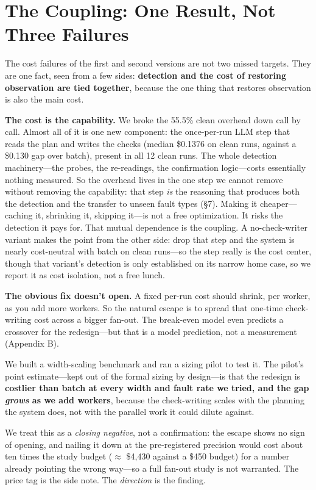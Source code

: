 \documentclass[acmsmall,screen]{acmart}
\begin{document}
\section{The Coupling: One Result, Not Three Failures}
The cost failures of the first and second versions are not two missed targets.
They are one fact, seen from a few sides: \textbf{detection and the cost of
restoring observation are tied together}, because the one thing that restores
observation is also the main cost.

\textbf{The cost is the capability.} We broke the 55.5\% clean overhead down
call by call. Almost all of it is one new component: the once-per-run LLM step
that reads the plan and writes the checks (median \$0.1376 on clean runs,
against a \$0.130 gap over batch), present in all 12 clean runs. The whole
detection machinery---the probes, the re-readings, the confirmation
logic---costs essentially nothing measured. So the overhead lives in the one
step we cannot remove without removing the capability: that step \emph{is} the
reasoning that produces both the detection and the transfer to unseen fault
types (\S7). Making it cheaper---caching it, shrinking it, skipping it---is not a
free optimization. It risks the detection it pays for. That mutual dependence is
the coupling. A no-check-writer variant makes the point from the other side:
drop that step and the system is nearly cost-neutral with batch on clean
runs---so the step really is the cost center, though that variant's detection is
only established on its narrow home case, so we report it as cost isolation, not
a free lunch.

\textbf{The obvious fix doesn't open.} A fixed per-run cost should shrink, per
worker, as you add more workers. So the natural escape is to spread that
one-time check-writing cost across a bigger fan-out. The break-even model even
predicts a crossover for the redesign---but that is a model prediction, not a
measurement (Appendix B).

We built a width-scaling benchmark and ran a sizing pilot to test it. The
pilot's point estimate---kept out of the formal sizing by design---is that the
redesign is \textbf{costlier than batch at every width and fault rate we tried,
and the gap \emph{grows} as we add workers}, because the check-writing scales
with the planning the system does, not with the parallel work it could dilute
against.

We treat this as a \emph{closing negative}, not a confirmation: the escape shows
no sign of opening, and nailing it down at the pre-registered precision would
cost about ten times the study budget ($\approx$ \$4,430 against a \$450 budget)
for a number already pointing the wrong way---so a full fan-out study is not
warranted. The price tag is the side note. The \emph{direction} is the finding.
\end{document}
